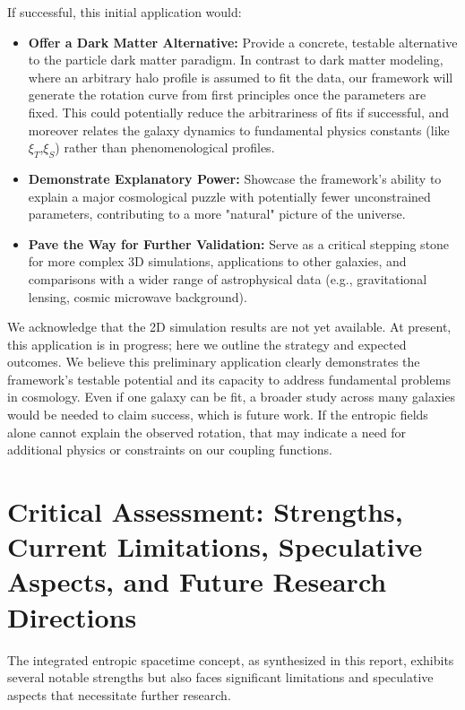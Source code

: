 \documentclass[11pt,a4paper]{article} %
\begin{document}
If successful, this initial application would:
\begin{itemize}
    \item \textbf{Offer a Dark Matter Alternative:} Provide a concrete, testable alternative to the particle dark matter paradigm. In contrast to dark matter modeling, where an arbitrary halo profile is assumed to fit the data, our framework will generate the rotation curve from first principles once the parameters are fixed. This could potentially reduce the arbitrariness of fits if successful, and moreover relates the galaxy dynamics to fundamental physics constants (like $\xi_T$,$\xi_S$) rather than phenomenological profiles.
    \item \textbf{Demonstrate Explanatory Power:} Showcase the framework's ability to explain a major cosmological puzzle with potentially fewer unconstrained parameters, contributing to a more "natural" picture of the universe.
    \item \textbf{Pave the Way for Further Validation:} Serve as a critical stepping stone for more complex 3D simulations, applications to other galaxies, and comparisons with a wider range of astrophysical data (e.g., gravitational lensing, cosmic microwave background).
\end{itemize}
We acknowledge that the 2D simulation results are not yet available. At present, this application is in progress; here we outline the strategy and expected outcomes. We believe this preliminary application clearly demonstrates the framework's testable potential and its capacity to address fundamental problems in cosmology. Even if one galaxy can be fit, a broader study across many galaxies would be needed to claim success, which is future work. If the entropic fields alone cannot explain the observed rotation, that may indicate a need for additional physics or constraints on our coupling functions.

\section{Critical Assessment: Strengths, Current Limitations, Speculative Aspects, and Future Research Directions}
The integrated entropic spacetime concept, as synthesized in this report, exhibits several notable strengths but also faces significant limitations and speculative aspects that necessitate further research.
\end{document}
